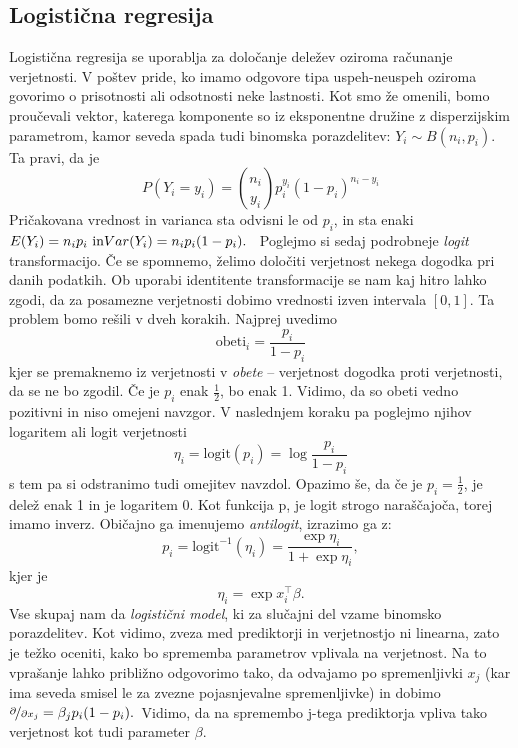 \documentclass[12pt,a4paper]{amsart}
\theoremstyle{definition} %
\theoremstyle{plain} %
\begin{document}
\subsection{Logistična regresija}
Logistična regresija se uporablja za določanje deležev oziroma računanje verjetnosti. V poštev pride, ko imamo odgovore tipa uspeh-neuspeh oziroma
govorimo o prisotnosti ali odsotnosti neke lastnosti. Kot smo že omenili, bomo proučevali vektor, katerega komponente so iz eksponentne družine z disperzijskim parametrom,
kamor seveda spada tudi binomska porazdelitev: $Y_{i} \sim B(n_{i}, p_{i})$. Ta pravi, da je 
\[
    P(Y_{i} = y_{i}) = {n_{i} \choose y_{i}} p_{i}^{y_{i}}(1 - p_{i}) ^{n_{i} - y_{i}}
\]
Pričakovana vrednost in varianca sta odvisni le od $p_{i}$, in sta enaki $E(Y_{i}) = n_{i}p_{i} \text{~in}\\Var(Y_{i}) = n_{i}p_{i}(1 - p_{i}).$~
Poglejmo si sedaj podrobneje \textit{logit} transformacijo. Če se spomnemo, želimo določiti verjetnost nekega dogodka pri danih podatkih. Ob uporabi
identitente transformacije se nam kaj hitro lahko zgodi, da za posamezne verjetnosti dobimo vrednosti izven intervala $[0,1]$. Ta problem bomo rešili v 
dveh korakih.
Najprej uvedimo 
\[ 
    \mathrm{obeti}_{i} = \frac{p_{i}}{1 - p_{i}} %
\]
kjer se premaknemo iz verjetnosti v \textit{obete} -- verjetnost dogodka proti verjetnosti, da se ne bo zgodil. Če je $p_{i}$ enak $\frac{1}{2}$, 
bo enak 1. Vidimo, da so obeti vedno pozitivni in niso omejeni navzgor.
V naslednjem koraku pa poglejmo njihov logaritem ali logit verjetnosti
\[
    \eta_{i} = \mathrm{logit}(p_{i}) = \log \frac{p_{i}}{1 - p_{i}}
\]
s tem pa si odstranimo tudi omejitev navzdol. Opazimo še, da če je $p_{i} = \frac{1}{2}$, je delež enak 1 in je logaritem 0. Kot funkcija p, je logit
strogo naraščajoča, torej imamo inverz. Običajno ga imenujemo \textit{antilogit}, izrazimo ga z:
\begin{equation}\label{p_i}
    p_{i} = \mathrm{logit}^{-1}(\eta_{i}) = \frac{\exp{\eta_{i}}}{1+\exp{\eta_{i}}},
\end{equation}
kjer je
\[
    \eta_{i} = \exp{x_{i}^\top\beta}.
\]
Vse skupaj nam da \textit{logistični model}, ki za slučajni del vzame binomsko porazdelitev. %
Kot vidimo, zveza med prediktorji in verjetnostjo ni linearna, zato je težko oceniti, kako bo sprememba parametrov
vplivala na verjetnost. Na to vprašanje lahko približno odgovorimo tako, da odvajamo po spremenljivki $x_{j}$ (kar ima seveda smisel le za zvezne
pojasnjevalne spremenljivke) in dobimo $\nicefrac{\partial}{\partial x_{j}} = \beta_{j}p_{i}(1 - p_{i}).$~Vidimo, da na spremembo j-tega prediktorja
vpliva tako verjetnost kot tudi parameter $\beta$.
\end{document}
